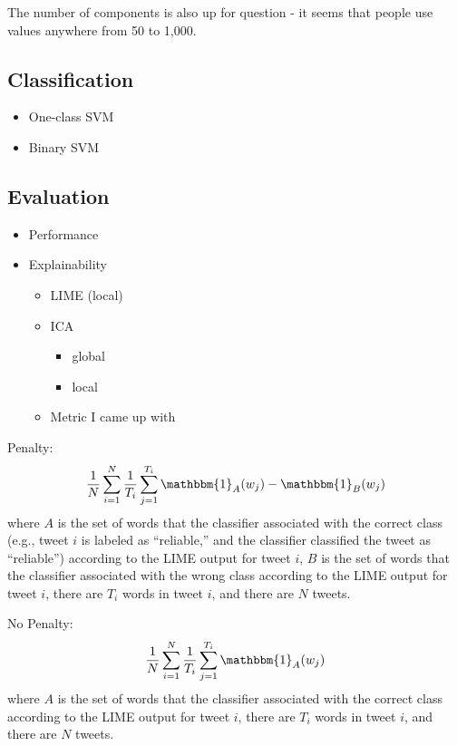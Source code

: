 \documentclass{article}
\begin{document}
The number of components is also up for question - it seems that people
use values anywhere from 50 to 1,000.

\hypertarget{classification}{%
\subsection{Classification}\label{classification}}

\begin{itemize}
\tightlist
\item
  One-class SVM
\item
  Binary SVM
\end{itemize}

\hypertarget{evaluation}{%
\subsection{Evaluation}\label{evaluation}}

\begin{itemize}
\tightlist
\item
  Performance
\item
  Explainability

  \begin{itemize}
  \tightlist
  \item
    LIME (local)
  \item
    ICA

    \begin{itemize}
    \tightlist
    \item
      global
    \item
      local
    \end{itemize}
  \item
    Metric I came up with
  \end{itemize}
\end{itemize}

Penalty: \[
\frac{1}{N} \sum_{i=1}^{N} \frac{1}{T_i} \sum_{j=1}^{T_i} \mathbbm{1}_A(w_j) - \mathbbm{1}_B(w_j)
\] where \(A\) is the set of words that the classifier associated with
the correct class (e.g., tweet \(i\) is labeled as ``reliable,'' and the
classifier classified the tweet as ``reliable'') according to the LIME
output for tweet \(i\), \(B\) is the set of words that the classifier
associated with the wrong class according to the LIME output for tweet
\(i\), there are \(T_i\) words in tweet \(i\), and there are \(N\)
tweets.

No Penalty: \[
\frac{1}{N} \sum_{i=1}^{N} \frac{1}{T_i} \sum_{j=1}^{T_i} \mathbbm{1}_A(w_j)
\] where \(A\) is the set of words that the classifier associated with
the correct class according to the LIME output for tweet \(i\), there
are \(T_i\) words in tweet \(i\), and there are \(N\) tweets.
\end{document}
